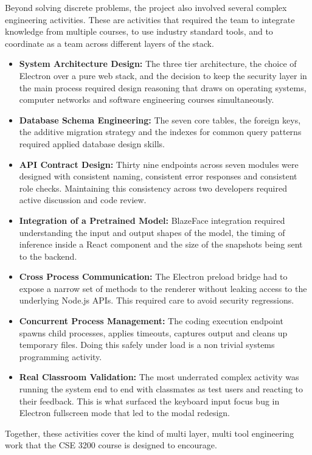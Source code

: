\documentclass[12pt, a4paper]{report}
\begin{document}
\begin{justify}
  {\fontsize{12}{18}\selectfont
    Beyond solving discrete problems, the project also involved several complex engineering activities. These are activities that required the team to integrate knowledge from multiple courses, to use industry standard tools, and to coordinate as a team across different layers of the stack.

    \begin{itemize}
        \item \textbf{System Architecture Design:} The three tier architecture, the choice of Electron over a pure web stack, and the decision to keep the security layer in the main process required design reasoning that draws on operating systems, computer networks and software engineering courses simultaneously.

        \item \textbf{Database Schema Engineering:} The seven core tables, the foreign keys, the additive migration strategy and the indexes for common query patterns required applied database design skills.

        \item \textbf{API Contract Design:} Thirty nine endpoints across seven modules were designed with consistent naming, consistent error responses and consistent role checks. Maintaining this consistency across two developers required active discussion and code review.

        \item \textbf{Integration of a Pretrained Model:} BlazeFace integration required understanding the input and output shapes of the model, the timing of inference inside a React component and the size of the snapshots being sent to the backend.

        \item \textbf{Cross Process Communication:} The Electron preload bridge had to expose a narrow set of methods to the renderer without leaking access to the underlying Node.js APIs. This required care to avoid security regressions.

        \item \textbf{Concurrent Process Management:} The coding execution endpoint spawns child processes, applies timeouts, captures output and cleans up temporary files. Doing this safely under load is a non trivial systems programming activity.

        \item \textbf{Real Classroom Validation:} The most underrated complex activity was running the system end to end with classmates as test users and reacting to their feedback. This is what surfaced the keyboard input focus bug in Electron fullscreen mode that led to the modal redesign.
    \end{itemize}

    Together, these activities cover the kind of multi layer, multi tool engineering work that the CSE 3200 course is designed to encourage.
  }
\end{justify}
\end{document}

